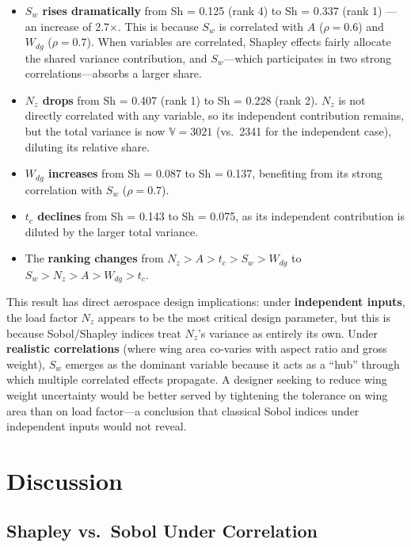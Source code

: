 \documentclass[11pt,a4paper]{article}
\begin{document}
\begin{itemize}[nosep]
    \item \textbf{$S_w$ rises dramatically} from Sh = 0.125 (rank 4) to Sh = 0.337 (rank 1) --- an increase of 2.7$\times$. This is because $S_w$ is correlated with $A$ ($\rho = 0.6$) and $W_{dg}$ ($\rho = 0.7$). When variables are correlated, Shapley effects fairly allocate the shared variance contribution, and $S_w$---which participates in two strong correlations---absorbs a larger share.
    \item \textbf{$N_z$ drops} from Sh = 0.407 (rank 1) to Sh = 0.228 (rank 2). $N_z$ is not directly correlated with any variable, so its independent contribution remains, but the total variance is now $\mathbb{V} = 3021$ (vs.\ 2341 for the independent case), diluting its relative share.
    \item \textbf{$W_{dg}$ increases} from Sh = 0.087 to Sh = 0.137, benefiting from its strong correlation with $S_w$ ($\rho = 0.7$).
    \item \textbf{$t_c$ declines} from Sh = 0.143 to Sh = 0.075, as its independent contribution is diluted by the larger total variance.
    \item The \textbf{ranking changes} from $N_z > A > t_c > S_w > W_{dg}$ to $S_w > N_z > A > W_{dg} > t_c$.
\end{itemize}

This result has direct aerospace design implications: under \textbf{independent inputs}, the load factor $N_z$ appears to be the most critical design parameter, but this is because Sobol/Shapley indices treat $N_z$'s variance as entirely its own. Under \textbf{realistic correlations} (where wing area co-varies with aspect ratio and gross weight), $S_w$ emerges as the dominant variable because it acts as a ``hub'' through which multiple correlated effects propagate. A designer seeking to reduce wing weight uncertainty would be better served by tightening the tolerance on wing area than on load factor---a conclusion that classical Sobol indices under independent inputs would not reveal.

\section{Discussion}

\subsection{Shapley vs.\ Sobol Under Correlation}
\end{document}
